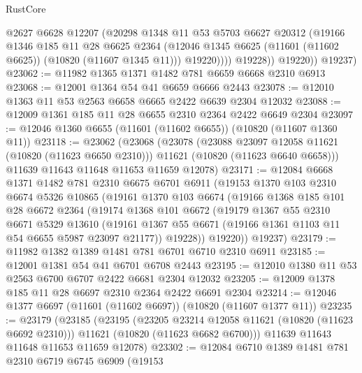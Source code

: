 \begin{lexlean}{RustCore}
\begin{coremodule}
                  @2627
                  @6628
                  @12207
                  (@20298
                    @1348
                    @11
                    @53
                    @5703
                    @6627
                    @20312
                    (@19166
                      @1346
                      @185
                      @11
                      @28
                      @6625
                      @2364
                      (@12046 @1345 @6625 (@11601 (@11602 @6625)) (@10820 (@11607 @1345 @11)))
                      @19220))))
              @19228))
          @19220))
      @19237)
@23062 := @11982 @1365 @1371 @1482 @781 @6659 @6668 @2310 @6913
@23068 := @12001 @1364 @54 @41 @6659 @6666 @2443
@23078 := @12010 @1363 @11 @53 @2563 @6658 @6665 @2422 @6639 @2304 @12032
@23088 := @12009 @1361 @185 @11 @28 @6655 @2310 @2364 @2422 @6649 @2304
@23097 := @12046 @1360 @6655 (@11601 (@11602 @6655)) (@10820 (@11607 @1360 @11))
@23118 := @23062
    (@23068
      (@23078
        (@23088 @23097 @12058 @11621 (@10820 (@11623 @6650 @2310)))
        @11621
        (@10820 (@11623 @6640 @6658)))
      @11639
      @11643
      @11648
      @11653
      @11659
      @12078)
@23171 := @12084
    @6668
    @1371
    @1482
    @781
    @2310
    @6675
    @6701
    @6911
    (@19153
      @1370
      @103
      @2310
      @6674
      @5326
      @10865
      (@19161
        @1370
        @103
        @6674
        (@19166
          @1368
          @185
          @101
          @28
          @6672
          @2364
          (@19174
            @1368
            @101
            @6672
            (@19179
              @1367
              @55
              @2310
              @6671
              @5329
              @13610
              (@19161 @1367 @55 @6671 (@19166 @1361 @1103 @11 @54 @6655 @5987 @23097 @21177))
              @19228))
          @19220))
      @19237)
@23179 := @11982 @1382 @1389 @1481 @781 @6701 @6710 @2310 @6911
@23185 := @12001 @1381 @54 @41 @6701 @6708 @2443
@23195 := @12010 @1380 @11 @53 @2563 @6700 @6707 @2422 @6681 @2304 @12032
@23205 := @12009 @1378 @185 @11 @28 @6697 @2310 @2364 @2422 @6691 @2304
@23214 := @12046 @1377 @6697 (@11601 (@11602 @6697)) (@10820 (@11607 @1377 @11))
@23235 := @23179
    (@23185
      (@23195
        (@23205 @23214 @12058 @11621 (@10820 (@11623 @6692 @2310)))
        @11621
        (@10820 (@11623 @6682 @6700)))
      @11639
      @11643
      @11648
      @11653
      @11659
      @12078)
@23302 := @12084
    @6710
    @1389
    @1481
    @781
    @2310
    @6719
    @6745
    @6909
    (@19153

\end{coremodule}
\end{lexlean}
